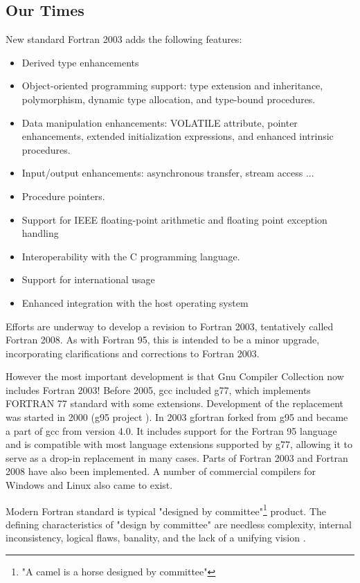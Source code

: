 \documentclass[a4paper]{article}
\begin{document}
\subsection {Our Times}
 New standard Fortran 2003 adds the following features:
   \begin{itemize}
	\item Derived type enhancements
	\item Object-oriented programming support: type extension and inheritance, 
	    polymorphism, dynamic type allocation, and type-bound procedures.
	\item Data manipulation enhancements:  VOLATILE attribute,  pointer enhancements, extended 
	    initialization expressions, and enhanced intrinsic procedures.
	\item Input/output enhancements: asynchronous transfer, stream access ... 
	\item Procedure pointers.
	\item Support for IEEE floating-point arithmetic and floating point exception handling 
	\item Interoperability with the C programming language.
	\item Support for international usage
	\item Enhanced integration with the host operating system
    \end{itemize}

Efforts are underway to develop a revision to Fortran 2003, tentatively called Fortran 2008. As with Fortran 95, this is intended to be a minor upgrade, incorporating clarifications and corrections to Fortran 2003. 

However the most important development is that Gnu Compiler Collection now includes Fortran 2003!
 Before 2005, gcc included g77, which implements FORTRAN 77 standard with some
    extensions. Development of the replacement was started in 2000 (g95 project \cite{g95}). In 2003
    gfortran \cite {gfortran} forked from g95 and became a part of gcc from version 4.0. It includes support for the
    Fortran 95 language and is compatible with most language extensions supported by g77, allowing
    it to serve as a drop-in replacement in many cases. Parts of Fortran 2003 and Fortran 2008
    have also been implemented. A number of commercial compilers for Windows and Linux also came to exist. 

Modern Fortran standard is typical "designed by committee"\footnote {"A camel is a horse designed by committee"} product. The defining characteristics of "design by committee" are needless complexity, internal inconsistency, logical flaws, banality, and the lack of a unifying vision  \cite{camel}.
\end{document}
